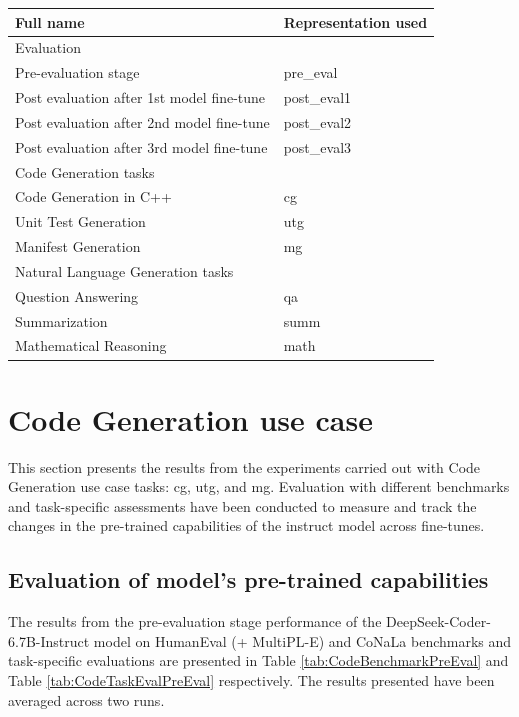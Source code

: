 \begin{tabular}{ll}
\textbf{Full name} & \textbf{Representation used} \\
\hline
Evaluation & \\
\hspace{1em} Pre-evaluation stage & pre\_eval \\
\hspace{1em} Post evaluation after 1st model fine-tune & post\_eval1 \\
\hspace{1em} Post evaluation after 2nd model fine-tune & post\_eval2 \\
\hspace{1em} Post evaluation after 3rd model fine-tune & post\_eval3 \\
Code Generation tasks & \\
\hspace{1em} Code Generation in C++ & cg \\
\hspace{1em} Unit Test Generation & utg \\
\hspace{1em} Manifest Generation & mg \\
Natural Language Generation tasks & \\
\hspace{1em} Question Answering & qa \\
\hspace{1em} Summarization & summ \\
\hspace{1em} Mathematical Reasoning & math \\
\end{tabular}

\section{Code Generation use case}
This section presents the results from the experiments carried out with Code Generation use case tasks: cg, utg, and mg. Evaluation with different benchmarks and task-specific assessments have been conducted to measure and track the changes in the pre-trained capabilities of the instruct model across fine-tunes. 

\subsection{Evaluation of model's pre-trained capabilities}
The results from the pre-evaluation stage performance of the DeepSeek-Coder-6.7B-Instruct model on HumanEval (+ MultiPL-E) and CoNaLa benchmarks and task-specific evaluations are presented in Table \ref{tab:CodeBenchmarkPreEval} and Table \ref{tab:CodeTaskEvalPreEval} respectively. The results presented have been averaged across two runs.


